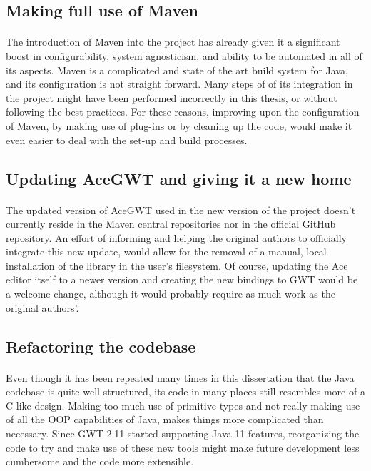 \subsection{Making full use of Maven}
\paragraph{}
The introduction of Maven into the project has already given it a significant boost in configurability, system agnosticism, and ability to be automated in all of its aspects. Maven is a complicated and state of the art build system for Java, and its configuration is not straight forward. Many steps of of its integration in the project might have been performed incorrectly in this thesis, or without following the best practices. For these reasons, improving upon the configuration of Maven, by making use of plug-ins or by cleaning up the code, would make it even easier to deal with the set-up and build processes.
\subsection{Updating AceGWT and giving it a new home}
\paragraph{}
The updated version of AceGWT used in the new version of the project doesn't currently reside in the Maven central repositories nor in the official GitHub repository. An effort of informing and helping the original authors to officially integrate this new update, would allow for the removal of a manual, local installation of the library in the user's filesystem. Of course, updating the Ace editor itself to a newer version and creating the new bindings to GWT would be a welcome change, although it would probably require as much work as the original authors'.
\subsection{Refactoring the codebase}
\paragraph{}
Even though it has been repeated many times in this dissertation that the Java codebase is quite well structured, its code in many places still resembles more of a C-like design. Making too much use of primitive types and not really making use of all the OOP capabilities of Java, makes things more complicated than necessary. Since GWT 2.11 started supporting Java 11 features, reorganizing the code to try and make use of these new tools might make future development less cumbersome and the code more extensible.
